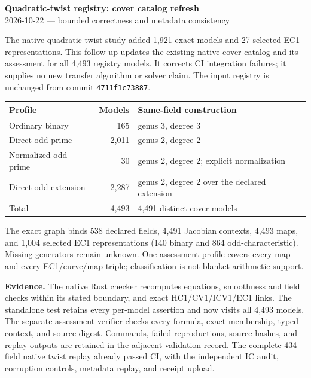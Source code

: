 \documentclass[10pt]{article}
\begin{document}
\begin{center}
{\Large\bfseries Quadratic-twist registry: cover catalog refresh}\\[5pt]
2026-10-22 \quad --- \quad bounded correctness and metadata consistency
\end{center}

The native quadratic-twist study added 1,921 exact models and 27 selected EC1
representations. This follow-up updates the existing native cover catalog and
its assessment for all 4,493 registry models. It corrects CI integration failures;
it supplies no new transfer algorithm or solver claim. The input registry is
unchanged from commit \texttt{4711f1c73887}.

\begin{center}
\begin{tabular}{lrl}
\toprule
Profile & Models & Same-field construction \\
\midrule
Ordinary binary & 165 & genus 3, degree 3 \\
Direct odd prime & 2,011 & genus 2, degree 2 \\
Normalized odd prime & 30 & genus 2, degree 2; explicit normalization \\
Direct odd extension & 2,287 & genus 2, degree 2 over the declared extension \\
\midrule
Total & 4,493 & 4,491 distinct cover models \\
\bottomrule
\end{tabular}
\end{center}

The exact graph binds 538 declared fields, 4,491 Jacobian contexts, 4,493 maps,
and 1,004 selected EC1 representations (140 binary and 864 odd-characteristic).
Missing generators remain unknown. One assessment profile covers every map and
every EC1/curve/map triple; classification is not blanket arithmetic support.

\textbf{Evidence.} The native Rust checker recomputes equations, smoothness and
field checks within its stated boundary, and exact HC1/CV1/ICV1/EC1 links.
The standalone test retains every per-model assertion and now visits all 4,493
models. The separate assessment verifier checks every formula, exact membership,
typed context, and source digest. Commands, failed reproductions, source hashes,
and replay outputs are retained in the adjacent validation record. The complete
434-field native twist replay already passed CI, with the independent IC audit,
corruption controls, metadata replay, and receipt upload.
\end{document}
